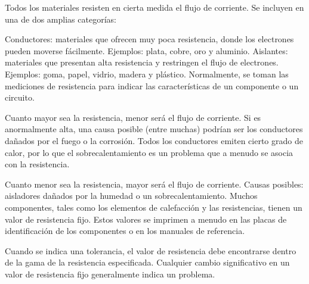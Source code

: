 Todos los materiales resisten en cierta medida el flujo de corriente. Se incluyen en una de dos amplias categorías:

Conductores: materiales que ofrecen muy poca resistencia, donde los electrones pueden moverse fácilmente. Ejemplos: plata, cobre, oro y aluminio.
Aislantes: materiales que presentan alta resistencia y restringen el flujo de electrones. Ejemplos: goma, papel, vidrio, madera y plástico.
Normalmente, se toman las mediciones de resistencia para indicar las características de un componente o un circuito.

Cuanto mayor sea la resistencia, menor será el flujo de corriente. Si es anormalmente alta, una causa posible (entre muchas) podrían ser los conductores dañados por el fuego o la corrosión. Todos los conductores emiten cierto grado de calor, por lo que el sobrecalentamiento es un problema que a menudo se asocia con la resistencia.

Cuanto menor sea la resistencia, mayor será el flujo de corriente. Causas posibles: aisladores dañados por la humedad o un sobrecalentamiento.
Muchos componentes, tales como los elementos de calefacción y las resistencias, tienen un valor de resistencia fijo. Estos valores se imprimen a menudo en las placas de identificación de los componentes o en los manuales de referencia.

Cuando se indica una tolerancia, el valor de resistencia debe encontrarse dentro de la gama de la resistencia especificada. Cualquier cambio significativo en un valor de resistencia fijo generalmente indica un problema.
 
